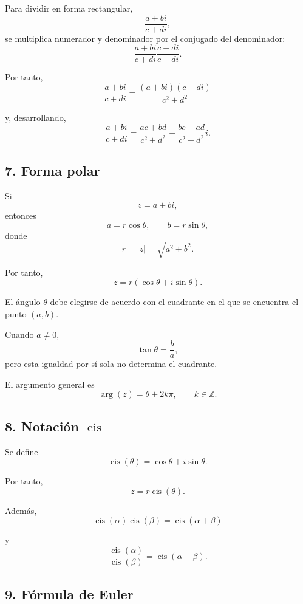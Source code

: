 \documentclass[12pt]{article}
\begin{document}
Para dividir en forma rectangular,
\[
\frac{a+bi}{c+di},
\]
se multiplica numerador y denominador por el conjugado del
denominador:
\[
\frac{a+bi}{c+di}
\frac{c-di}{c-di}.
\]

Por tanto,
\[
\boxed{
\frac{a+bi}{c+di}
=
\frac{(a+bi)(c-di)}{c^2+d^2}
}
\]

y, desarrollando,
\[
\boxed{
\frac{a+bi}{c+di}
=
\frac{ac+bd}{c^2+d^2}
+
\frac{bc-ad}{c^2+d^2}i
}.
\]

\subsection*{7. Forma polar}

Si
\[
z=a+bi,
\]
entonces
\[
a=r\cos\theta,
\qquad
b=r\sin\theta,
\]
donde
\[
\boxed{r=|z|=\sqrt{a^2+b^2}}.
\]

Por tanto,
\[
\boxed{
z=r(\cos\theta+i\sin\theta).
}
\]

El ángulo $\theta$ debe elegirse de acuerdo con el cuadrante
en el que se encuentra el punto $(a,b)$.

Cuando $a\neq0$,
\[
\tan\theta=\frac{b}{a},
\]
pero esta igualdad por sí sola no determina el cuadrante.

El argumento general es
\[
\boxed{
\arg(z)=\theta+2k\pi,
\qquad k\in\mathbb Z.
}
\]

\subsection*{8. Notación $\operatorname{cis}$}

Se define
\[
\boxed{
\operatorname{cis}(\theta)
=
\cos\theta+i\sin\theta.
}
\]

Por tanto,
\[
\boxed{
z=r\operatorname{cis}(\theta).
}
\]

Además,
\[
\operatorname{cis}(\alpha)
\operatorname{cis}(\beta)
=
\boxed{\operatorname{cis}(\alpha+\beta)}
\]

y
\[
\boxed{
\frac{\operatorname{cis}(\alpha)}
     {\operatorname{cis}(\beta)}
=
\operatorname{cis}(\alpha-\beta).
}
\]

\subsection*{9. Fórmula de Euler}
\end{document}
